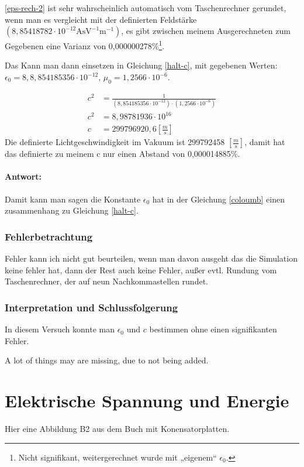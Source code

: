 \documentclass{report}
\begin{document}
\ref{eps-rech-2} ist sehr wahrscheinlich automatisch vom Taschenrechner gerundet,
wenn man es vergleicht mit der definierten Feldstärke $(8,85418782\cdot
10^{-12}\text{AsV}^{-1}\text{m}^{-1})$, es gibt zwischen meinem
Ausgerechneten zum Gegebenen eine Varianz von 0,000000278\%\footnote{Nicht
signifikant, weitergerechnet wurde mit  „eigenem“ $\epsilon_0$.}.

Das Kann man dann einsetzen in Gleichung \ref{halt-c}, mit gegebenen Werten:
$\epsilon_0 = 8,8,854185356 \cdot 10^{-12}$, $\mu_0=1,2566\cdot 10^{-6}$.

\begin{align}
  c^2 &= \frac{1}{(8,854185356 \cdot 10^{-12})\cdot (1,2566\cdot 10^{-6})}\\
  c^2 &= 8,98781936\cdot 10^{16}\\
  c   &= 299796920,6 \left[\frac{m}{s}\right]
\end{align}
Die definierte Lichtgeschwindigkeit im Vakuum ist 299792458
$\left[\frac{m}{s}\right]$, damit hat das definierte zu meinem c nur einen
Abstand von 0,000014885\%.

\paragraph{Antwort:}
Damit kann man sagen die Konstante $\epsilon_0$ hat in der Gleichung
\ref{coloumb} einen zusammenhang zu Gleichung \ref{halt-c}.


\subsubsection{Fehlerbetrachtung} %
\label{ssub:Fehlerbetrachtung}
Fehler kann ich nicht gut beurteilen, wenn man davon ausgeht das die Simulation
keine fehler hat, dann der Rest auch keine Fehler, außer evtl. Rundung vom
Taschenrechner, der auf neun Nachkommastellen rundet.


\subsubsection{Interpretation und Schlussfolgerung} %
\label{ssub:Interpretation und Schlussfolgerung}
In diesem Versuch konnte man $\epsilon_0$ und $c$ bestimmen ohne einen signifikanten Fehler.


A lot of things may are missing, due to not being added.
\section{Elektrische Spannung und Energie}
Hier eine Abbildung B2 aus dem Buch mit Konensatorplatten.
\end{document}
